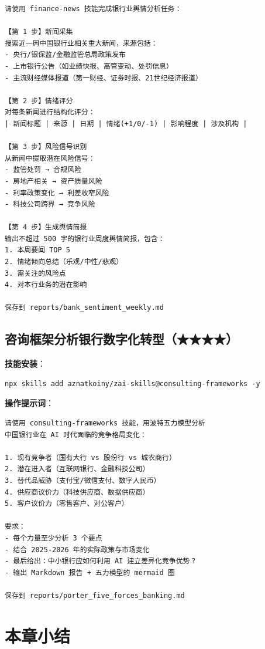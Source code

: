 \begin{lstlisting}
请使用 finance-news 技能完成银行业舆情分析任务：

【第 1 步】新闻采集
搜索近一周中国银行业相关重大新闻，来源包括：
- 央行/银保监/金融监管总局政策发布
- 上市银行公告（如业绩快报、高管变动、处罚信息）
- 主流财经媒体报道（第一财经、证券时报、21世纪经济报道）

【第 2 步】情绪评分
对每条新闻进行结构化评分：
| 新闻标题 | 来源 | 日期 | 情绪(+1/0/-1) | 影响程度 | 涉及机构 |

【第 3 步】风险信号识别
从新闻中提取潜在风险信号：
- 监管处罚 → 合规风险
- 房地产相关 → 资产质量风险
- 利率政策变化 → 利差收窄风险
- 科技公司跨界 → 竞争风险

【第 4 步】生成舆情简报
输出不超过 500 字的银行业周度舆情简报，包含：
1. 本周要闻 TOP 5
2. 情绪倾向总结（乐观/中性/悲观）
3. 需关注的风险点
4. 对本行业务的潜在影响

保存到 reports/bank_sentiment_weekly.md
\end{lstlisting}

\subsection{咨询框架分析银行数字化转型（★★★★）}

\textbf{技能安装}：

\begin{lstlisting}[style=shell]
npx skills add aznatkoiny/zai-skills@consulting-frameworks -y
\end{lstlisting}

\textbf{操作提示词}：

\begin{lstlisting}
请使用 consulting-frameworks 技能，用波特五力模型分析
中国银行业在 AI 时代面临的竞争格局变化：

1. 现有竞争者（国有大行 vs 股份行 vs 城农商行）
2. 潜在进入者（互联网银行、金融科技公司）
3. 替代品威胁（支付宝/微信支付、数字人民币）
4. 供应商议价力（科技供应商、数据供应商）
5. 客户议价力（零售客户、对公客户）

要求：
- 每个力量至少分析 3 个要点
- 结合 2025-2026 年的实际政策与市场变化
- 最后给出：中小银行应如何利用 AI 建立差异化竞争优势？
- 输出 Markdown 报告 + 五力模型的 mermaid 图

保存到 reports/porter_five_forces_banking.md
\end{lstlisting}

\section*{本章小结}

